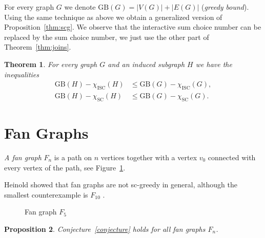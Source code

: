 \documentclass[11pt,a4paper]{article}
\theoremstyle{plain}
\newtheorem{thm}{Theorem}[section]
\newtheorem{prop}[thm]{Proposition}
\theoremstyle{definition}
\theoremstyle{remark}
\newcommand{\scn}{\chi_\text{SC}}
\newcommand{\iscn}{\chi_\text{ISC}}
\newcommand{\gb}{\text{GB}}
\begin{document}
For every graph $G$ we denote $\gb(G) = |V(G)| + |E(G)|$ (\emph{greedy bound}). Using the same technique as above we obtain a generalized version of Proposition~\ref{thm:scg}. We observe that the interactive sum choice number can be replaced by the sum choice number, we just use the other part of Theorem~\ref{thm:joins}.

\begin{thm}
For every graph $G$ and an induced subgraph $H$ we have the inequalities
\begin{align*}
\gb(H) - \iscn(H) &\leq \gb(G) - \iscn(G), \\
\gb(H) - \scn(H) &\leq \gb(G) - \scn(G).
\end{align*}
\end{thm}

\section{Fan Graphs}

\emph{A fan graph} $F_n$ is a path on $n$ vertices together with a vertex $v_0$ connected with every vertex of the path, see Figure~\ref{fig:fan}.

Heinold showed that fan graphs are not sc-greedy in general, although the smallest counterexample is $F_{10}$ \cite{heinold2006}.

\begin{figure}[h]
\centering
{}
\caption{Fan graph $F_5$}
\label{fig:fan}
\end{figure}



\begin{prop}
Conjecture~\ref{conjecture} holds for all fan graphs $F_n$.
\end{prop}
\end{document}
